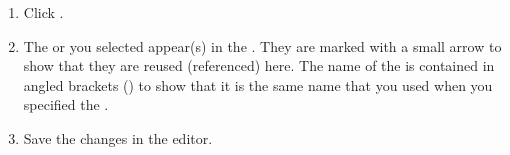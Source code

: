 \begin{enumerate}
\item Click . 

\item The \gdcase{} or \gdcases{} you selected appear(s) in the \gdtestcaseeditor{}. They are marked with a small arrow to show that they are reused (referenced) here. The name of the \gdcase{} is contained in angled brackets (\bxshell{< >}) to show that it is the same name that you used when you specified the \gdcase{}. 
\item Save the changes in the editor.
\end{enumerate}

